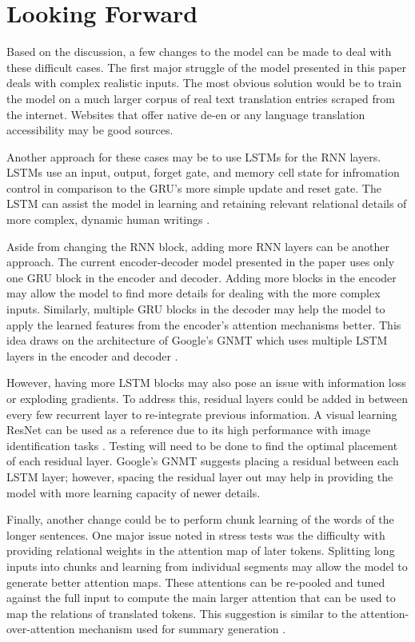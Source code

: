 \documentclass[11pt,a4paper]{article}
\begin{document}


\section{Looking Forward}
Based on the discussion, a few changes to the model can be made to deal with these difficult cases. The first major struggle of the model presented in this paper deals with complex realistic inputs. The most obvious solution would be to train the model on a much larger corpus of real text translation entries scraped from the internet. Websites that offer native de-en or any language translation accessibility may be good sources. 

Another approach for these cases may be to use LSTMs for the RNN layers. LSTMs use an input, output, forget gate, and memory cell state for infromation control in comparison to the GRU's more simple update and reset gate. The LSTM can assist the model in learning and retaining relevant relational details of more complex, dynamic human writings \cite{Srivatsavaya_2023}. 

Aside from changing the RNN block, adding more RNN layers can be another approach. The current encoder-decoder model presented in the paper uses only one GRU block in the encoder and decoder. Adding more blocks in the encoder may allow the model to find more details for dealing with the more complex inputs. Similarly, multiple GRU blocks in the decoder may help the model to apply the learned features from the encoder's attention mechanisms better. This idea draws on the architecture of Google's GNMT which uses multiple LSTM layers in the encoder and decoder \cite{wu2016googles}.

However, having more LSTM blocks may also pose an issue with information loss or exploding gradients. To address this, residual layers could be added in between every few recurrent layer to re-integrate previous information. A visual learning ResNet can be used as a reference due to its high performance with image identification tasks \cite{he2015deep}. Testing will need to be done to find the optimal placement of each residual layer. Google's GNMT suggests placing a residual between each LSTM layer; however, spacing the residual layer out may help in providing the model with more learning capacity of newer details.

Finally, another change could be to perform chunk learning of the words of the longer sentences. One major issue noted in stress tests was the difficulty with providing relational weights in the attention map of later tokens. Splitting long inputs into chunks and learning from individual segments may allow the model to generate better attention maps. These attentions can be re-pooled and tuned against the full input to compute the main larger attention that can be used to map the relations of translated tokens. This suggestion is similar to the attention-over-attention mechanism used for summary generation \cite{Cui_2017}.
\end{document}
